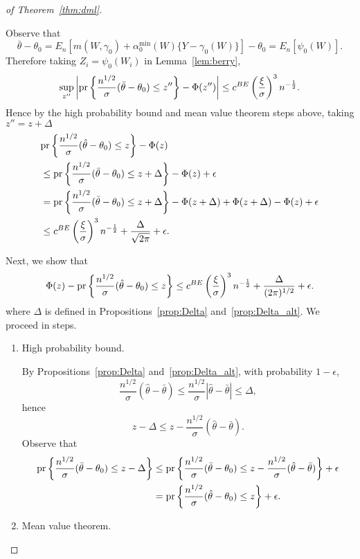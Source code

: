 \begin{proof}[of Theorem~\ref{thm:dml}]
\begin{enumerate}
    Observe that
$$
   \bar{\theta}-\theta_0
   =E_n[m(W,\gamma_0)+\alpha_0^{\min}(W)\{Y-\gamma_0(W)\}]-\theta_0 
   =E_n[\psi_0(W)].
$$
    Therefore taking $Z_i=\psi_0(W_i)$ in Lemma~\ref{lem:berry},
$$
\sup_{z''}\left|\text{\normalfont pr}\left\{\frac{n^{1/2}}{\sigma}(\bar{\theta}-\theta_0)\leq z''\right\}-\Phi(z'')\right|\leq c^{BE} \left(\frac{\xi}{\sigma}\right)^3n^{-\frac{1}{2}}.
$$
Hence by the high probability bound and mean value theorem steps above, taking $z''=z+\Delta$
\begin{align*}
    &\text{\normalfont pr}\left\{\frac{n^{1/2}}{\sigma}(\hat{\theta}-\theta_0)\leq z\right\}-\Phi(z)\\
    &\leq \text{\normalfont pr}\left\{\frac{n^{1/2}}{\sigma}(\bar{\theta}-\theta_0)\leq z+\Delta\right\}-\Phi(z)+\epsilon \\
    &=\text{\normalfont pr}\left\{\frac{n^{1/2}}{\sigma}(\bar{\theta}-\theta_0)\leq z+\Delta\right\}-\Phi(z+\Delta)+\Phi(z+\Delta)-\Phi(z)+\epsilon \\
    &\leq c^{BE} \left(\frac{\xi}{\sigma}\right)^3n^{-\frac{1}{2}}+\frac{\Delta}{\sqrt{2 \pi}}+\epsilon.
\end{align*}
\end{enumerate}
Next, we show that
$$
\Phi(z)-\text{\normalfont pr}\left\{\frac{n^{1/2}}{\sigma}(\hat{\theta}-\theta_0)\leq z\right\}\leq c^{BE}\left(\frac{\xi}{\sigma}\right)^3n^{-\frac{1}{2}} +\frac{\Delta}{(2\pi)^{1/2}}+\epsilon.
$$
where $\Delta$ is defined in Propositions~\ref{prop:Delta} and~\ref{prop:Delta_alt}. We proceed in steps.
\begin{enumerate}
    \item High probability bound. 
    
    By Propositions~\ref{prop:Delta} and~\ref{prop:Delta_alt}, with probability $1-\epsilon$, 
$$
\frac{n^{1/2}}{\sigma}(\hat{\theta}-\bar{\theta}) \leq \frac{n^{1/2}}{\sigma}|\hat{\theta}-\bar{\theta}|\leq \Delta,
$$
hence
$$
z-\Delta \leq z-\frac{n^{1/2}}{\sigma}(\hat{\theta}-\bar{\theta}).
$$
Observe that
\begin{align*}
    \text{\normalfont pr}\left\{\frac{n^{1/2}}{\sigma}(\bar{\theta}-\theta_0)\leq z-\Delta \right\}
    &\leq \text{\normalfont pr}\left\{\frac{n^{1/2}}{\sigma}(\bar{\theta}-\theta_0)\leq z-\frac{n^{1/2}}{\sigma}(\hat{\theta}-\bar{\theta}) \right\}+\epsilon \\
    &=\text{\normalfont pr}\left\{\frac{n^{1/2}}{\sigma}(\hat{\theta}-\theta_0)\leq z \right\}+\epsilon.
\end{align*}
    \item Mean value theorem. 
    

\end{enumerate}
\end{proof}
